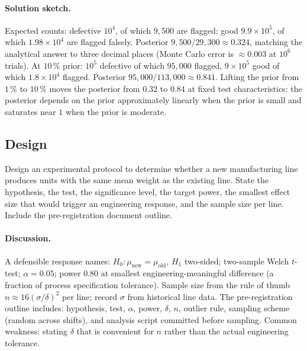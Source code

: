 \paragraph{Solution sketch.}
Expected counts: defective $10^{4}$, of which $9{,}500$ are flagged;
good $9.9 \times 10^{5}$, of which $1.98 \times 10^{4}$ are flagged
falsely. Posterior $9{,}500/29{,}300 \approx 0.324$, matching the
analytical answer to three decimal places (Monte Carlo error is
$\approx 0.003$ at $10^{6}$ trials). At $10 \,\%$ prior: $10^{5}$
defective of which $95{,}000$ flagged, $9 \times 10^{5}$ good of
which $1.8 \times 10^{4}$ flagged. Posterior $95{,}000/113{,}000
\approx 0.841$. Lifting the prior from $1 \,\%$ to $10 \,\%$ moves
the posterior from $0.32$ to $0.84$ at fixed test characteristics:
the posterior depends on the prior approximately linearly when the
prior is small and saturates near $1$ when the prior is moderate.

\subsection*{Design}

\begin{exercise}
Design an experimental protocol to determine whether a new
manufacturing line produces units with the same mean weight as the
existing line. State the hypothesis, the test, the significance
level, the target power, the smallest effect size that would
trigger an engineering response, and the sample size per line.
Include the pre-registration document outline.
\end{exercise}

\paragraph{Discussion.}
A defensible response names: $H_{0}: \mu_{\text{new}} =
\mu_{\text{old}}$, $H_{1}$ two-sided; two-sample Welch $t$-test;
$\alpha = 0.05$; power $0.80$ at smallest engineering-meaningful
difference (a fraction of process specification tolerance). Sample
size from the rule of thumb $n \approx 16(\sigma/\delta)^{2}$ per
line; record $\sigma$ from historical line data. The
pre-registration outline includes: hypothesis, test, $\alpha$,
power, $\delta$, $n$, outlier rule, sampling scheme (random across
shifts), and analysis script committed before sampling. Common
weakness: stating $\delta$ that is convenient for $n$ rather than
the actual engineering tolerance.

